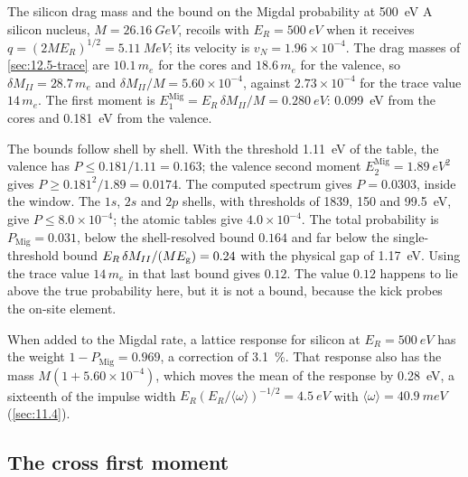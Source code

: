 \begin{workedexample}{The silicon drag mass and the bound on the Migdal probability at \SI{500}{eV}}\label{we:12-drag}
A silicon nucleus, $M = \SI{26.16}{GeV}$, recoils with $E_R = \SI{500}{eV}$ when it receives $q = (2ME_R)^{1/2} = \SI{5.11}{MeV}$; its velocity is $v_N = 1.96\times10^{-4}$. The drag masses of \cref{sec:12.5-trace} are $10.1\,m_e$ for the cores and $18.6\,m_e$ for the valence, so $\delta M_{II} = 28.7\,m_e$ and $\delta M_{II}/M = 5.60\times10^{-4}$, against $2.73\times10^{-4}$ for the trace value $14\,m_e$. The first moment is $E^{\mathrm{Mig}}_1 = E_R\,\delta M_{II}/M = \SI{0.280}{eV}$: \SI{0.099}{eV} from the cores and \SI{0.181}{eV} from the valence.

The bounds follow shell by shell. With the threshold \SI{1.11}{eV} of the table, the valence has $P \le 0.181/1.11 = 0.163$; the valence second moment $E^{\mathrm{Mig}}_2 = \SI{1.89}{eV^2}$ gives $P \ge 0.181^2/1.89 = 0.0174$. The computed spectrum gives $P = 0.0303$, inside the window. The $1s$, $2s$ and $2p$ shells, with thresholds of 1839, 150 and \SI{99.5}{eV}, give $P \le 8.0\times10^{-4}$; the atomic tables give $4.0\times10^{-4}$. The total probability is $P_{\mathrm{Mig}} = 0.031$, below the shell-resolved bound $0.164$ and far below the single-threshold bound $E_R\,\delta M_{II}/(ME_{\mathrm{g}}) = 0.24$ with the physical gap of \SI{1.17}{eV}. Using the trace value $14\,m_e$ in that last bound gives $0.12$. The value $0.12$ happens to lie above the true probability here, but it is not a bound, because the kick probes the on-site element.

When added to the Migdal rate, a lattice response for silicon at $E_R = \SI{500}{eV}$ has the weight $1 - P_{\mathrm{Mig}} = 0.969$, a correction of \SI{3.1}{\percent}. That response also has the mass $M(1 + 5.60\times10^{-4})$, which moves the mean of the response by \SI{0.28}{eV}, a sixteenth of the impulse width $E_R(E_R/\langle\omega\rangle)^{-1/2} = \SI{4.5}{eV}$ with $\langle\omega\rangle = \SI{40.9}{meV}$ (\cref{sec:11.4}).
\end{workedexample}

\subsection{The cross first moment}\label{sec:12.5-cross}

